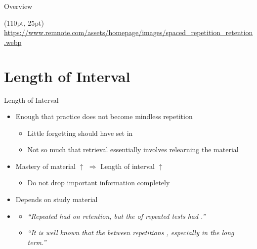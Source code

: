 \documentclass{ercisbeamer}
\begin{document}
\begin{frame}{Overview}
\begin{picture}
    \end{picture}
    \begin{textblock*}{400pt}(110pt, 25pt)
        \tiny \url{https://www.remnote.com/assets/homepage/images/spaced_repetition_retention.webp}
    \end{textblock*}
\end{frame}

\section{Length of Interval}
\begin{frame}{Length of Interval}
    \begin{tbox}
        \begin{itemize}
            \item Enough that practice does not become mindless repetition
            \begin{itemize}
                \item Little forgetting should have set in
                \item Not so much that retrieval essentially involves relearning the material
            \end{itemize}
            \item Mastery of material $\uparrow$ $\Rightarrow$ Length of interval $\uparrow$
            \begin{itemize}
                \item Do not drop important information completely
            \end{itemize}
            \item Depends on study material
        \end{itemize}
    \end{tbox}
    
    \hspace{2em}
    
    \begin{tbox}
        \begin{itemize}
            \item \citet{karpicke11}
            \begin{itemize}
                \item \emph{``Repeated  had  on retention, but the  of repeated tests had .''}
                \item \emph{``It is well known that  the  between repetitions , especially in the long term.''}
            \end{itemize}
        \end{itemize}
    \end{tbox}
\end{frame}
\setbgimage{}
\end{document}
